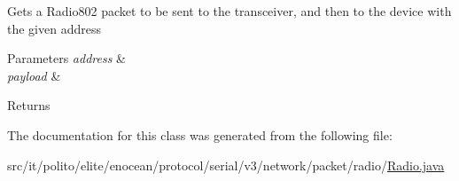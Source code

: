 Gets a Radio802 packet to be sent to the transceiver, and then to the device with the given address


\begin{DoxyParams}{Parameters}
{\em address} & \\
\hline
{\em payload} & \\
\hline
\end{DoxyParams}
\begin{DoxyReturn}{Returns}

\end{DoxyReturn}


The documentation for this class was generated from the following file\+:\begin{DoxyCompactItemize}
\item 
src/it/polito/elite/enocean/protocol/serial/v3/network/packet/radio/\hyperlink{_radio_8java}{Radio.\+java}\end{DoxyCompactItemize}

